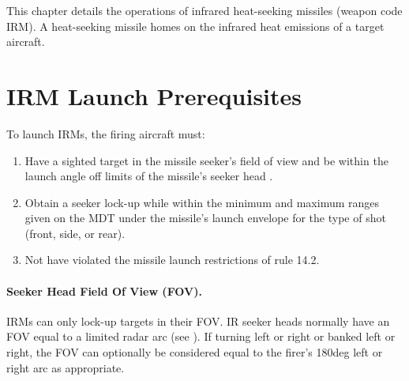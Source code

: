 
\label{rule:infrared-heat-seeking-missiles}

This chapter details the operations of infrared heat-seeking missiles (weapon code IRM). A heat-seeking missile homes on the infrared heat emissions of a target aircraft.

\section{IRM Launch Prerequisites}
\label{rule:irm-launch-prerequisites}
\label{rule:irm-launch-requirements}

To launch IRMs, the firing aircraft must:

\begin{enumerate}
    \item Have a sighted target in the missile seeker's field of view and be within the launch angle off limits of the missile's seeker head . 
    \item Obtain a seeker lock-up while within the minimum and maximum ranges given on the MDT under the missile's launch envelope for the type of shot (front, side, or rear).
    \item Not have violated the missile launch restrictions of rule 14.2.
\end{enumerate}

\paragraph{Seeker Head Field Of View (FOV).} IRMs can only lock-up targets in their FOV. IR seeker heads normally have an FOV equal to a limited radar arc (see ). If turning left or right or banked left or right, the FOV can optionally be considered equal to the firer’s 180{deg} left or right arc as appropriate. 

